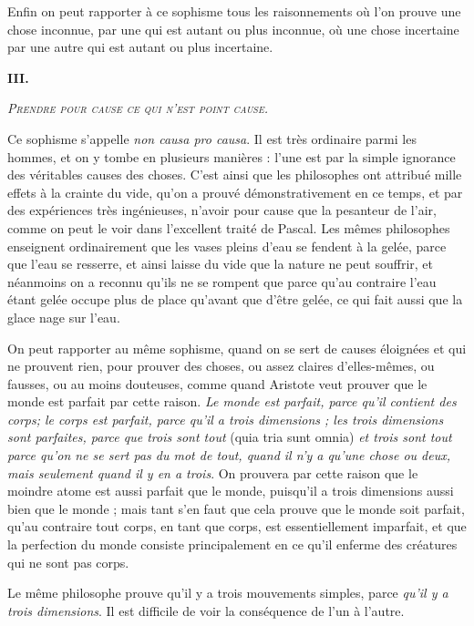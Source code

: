 Enfin on peut rapporter à ce sophisme tous les raisonnements où l'on prouve une chose inconnue, par une qui est autant ou plus inconnue, où une chose incertaine par une autre qui est autant ou plus incertaine.

\begin{center}{\bfseries\large III.}\end{center}
\begin{center}\emph{\scshape Prendre pour cause ce qui n'est point cause.}\end{center}

Ce sophisme s'appelle \emph{non causa pro causa}. Il est très ordinaire parmi les hommes, et on y tombe en plusieurs manières : l'une est par la simple ignorance des véritables causes des choses. C'est ainsi que les philosophes ont attribué mille effets à la crainte du vide, qu'on a prouvé démonstrativement en ce temps, et par des expériences très ingénieuses, n'avoir pour cause que la pesanteur de l'air, comme on peut le voir dans l'excellent traité de Pascal. Les mêmes philosophes enseignent ordinairement que les vases pleins d'eau se fendent à la gelée, parce que l'eau se resserre, et ainsi laisse du vide que la nature ne peut souffrir, et néanmoins on a reconnu qu'ils ne se rompent que parce qu'au contraire l'eau étant gelée occupe plus de place qu'avant que d'être gelée, ce qui fait aussi que la glace nage sur l'eau.

On peut rapporter au même sophisme, quand on se sert de causes éloignées et qui ne prouvent rien, pour prouver des choses, ou assez claires d'elles-mêmes, ou fausses, ou au moins douteuses, comme quand Aristote veut prouver que le monde est parfait par cette raison. \emph{Le monde est parfait, parce qu'il contient des corps; le corps est parfait, parce qu'il a trois dimensions ; les trois dimensions sont parfaites, parce que trois sont tout} (quia tria sunt omnia) \emph{et trois sont tout parce qu'on ne se sert pas du mot de tout, quand il n'y a qu'une chose ou deux, mais seulement quand il y en a trois}. On prouvera par cette raison que le moindre atome est aussi parfait que le monde, puisqu'il a trois dimensions aussi bien que le monde ; mais tant s'en faut que cela prouve que le monde soit parfait, qu'au contraire tout corps, en tant que corps, est essentiellement imparfait, et que la perfection du monde consiste principalement en ce qu'il enferme des créatures qui ne sont pas corps.

Le même philosophe prouve qu'il y a trois mouvements simples, parce \emph{qu'il y a trois dimensions}. Il est difficile de voir la conséquence de l'un à l'autre.

